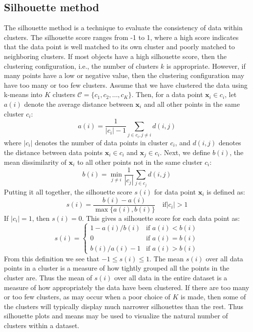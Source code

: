 \documentclass{article}[11pt]
\begin{document}
\subsection{Silhouette method}
The silhouette method is a technique to evaluate the consistency of data within clusters.
The silhouette score ranges from -1 to 1, where a high score indicates that the data point is well matched to its own cluster and poorly matched to neighboring clusters.
If most objects have a high silhouette score, then the clustering configuration, i.e., the number of clusters $k$ is appropriate. 
However, if many points have a low or negative value, then the clustering configuration may have too many or too few clusters.
Assume that we have clustered the data using k-means into $K$ clusters $\mathcal{C} = \{c_1, c_2, \ldots, c_K\}$.
Then, for a data point $\mathbf{x}_i\in c_i$, let $a(i)$ denote the average distance between $\mathbf{x}_i$ and all other points in the same cluster $c_i$:
\begin{equation}
a(i) = \frac{1}{|c_i| - 1}\sum_{j\in c_i, j\neq i}d(i,j)
\end{equation}
where $|c_i|$ denotes the number of data points in cluster $c_i$, and $d(i,j)$ denotes the distance between data points $\mathbf{x}_i\in{c_{i}}$ and $\mathbf{x}_j\in{c_{i}}$.
Next, we define $b(i)$, the mean dissimilarity of $\mathbf{x}_i$ to all other points not in the same cluster $c_i$:
\begin{equation}
b(i) = \min_{j\neq i}\frac{1}{|c_j|}\sum_{j\in c_j}d(i,j)
\end{equation}
Putting it all together, the silhouette score $s(i)$ for data point $\mathbf{x}_i$ is defined as:
\begin{equation}
s(i) = \frac{b(i) - a(i)}{\max\{a(i), b(i)\}}\quad\text{if}|c_i|>1
\end{equation}
If $|c_i|=1$, then $s(i)=0$. This gives a silhouette score for each data point as:
\begin{equation}
   s(i) =
   \begin{cases}
      1 - a(i)/b(i) & \text{if } a(i) < b(i)\\ 
      0 & \text{if } a(i) = b(i)\\
      b(i)/a(i) - 1 & \text{if } a(i) > b(i)
   \end{cases}
\end{equation}
From this definition we see that $-1\leq s(i)\leq 1$. 
The mean $s(i)$ over all data points in a cluster is a measure of how tightly grouped all the points in the cluster are.
Thus the mean of $s(i)$ over all data in the entire dataset is a measure of how appropriately the data have been clustered.
If there are too many or too few clusters, as may occur when a poor choice of $K$ is made, then 
some of the clusters will typically display much narrower silhouettes than the rest. 
Thus silhouette plots and means may be used to visualize the natural number of clusters within a dataset.
\end{document}
